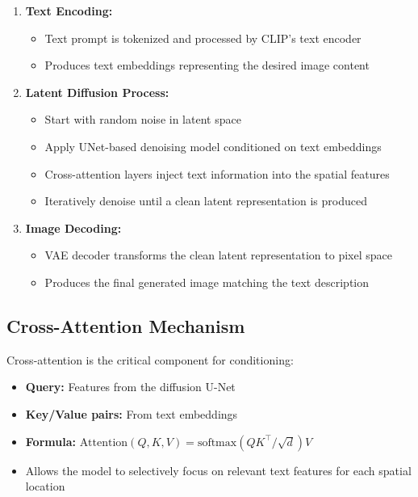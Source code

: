 \begin{enumerate}
    \item \textbf{Text Encoding:}
    \begin{itemize}
        \item Text prompt is tokenized and processed by CLIP’s text encoder
        \item Produces text embeddings representing the desired image content
    \end{itemize}
    
    \item \textbf{Latent Diffusion Process:}
    \begin{itemize}
        \item Start with random noise in latent space
        \item Apply UNet-based denoising model conditioned on text embeddings
        \item Cross-attention layers inject text information into the spatial features
        \item Iteratively denoise until a clean latent representation is produced
    \end{itemize}
    
    \item \textbf{Image Decoding:}
    \begin{itemize}
        \item VAE decoder transforms the clean latent representation to pixel space
        \item Produces the final generated image matching the text description
    \end{itemize}
\end{enumerate}

\subsection*{Cross-Attention Mechanism}
Cross-attention is the critical component for conditioning:
\begin{itemize}
    \item \textbf{Query:} Features from the diffusion U-Net
    \item \textbf{Key/Value pairs:} From text embeddings
    \item \textbf{Formula:} $\text{Attention}(Q, K, V) = \text{softmax}(QK^\top / \sqrt{d})V$
    \item Allows the model to selectively focus on relevant text features for each spatial location
\end{itemize}

